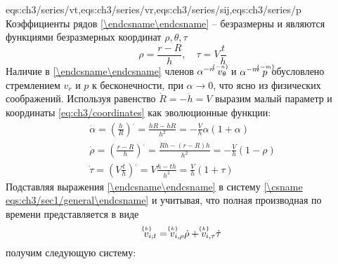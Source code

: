 \expandafter\gdef\csname eqs:ch3/series\endcsname{eqs:ch3/series/vt,eqs:ch3/series/vr,eqs:ch3/series/sij,eqs:ch3/series/p}
Коэффициенты рядов \cref{\csname eqs:ch3/series\endcsname} -- безразмерны и являются функциями безразмерных координат $\rho, \theta, \tau$
\begin{equation}
  \label{eq:ch3/coordinates}
  \rho = \frac{r-R}{h}, \quad \tau = V \frac{t}{h}
\end{equation}
Наличие в \cref{\csname eqs:ch3/series\endcsname} членов $\alpha^{-n} \; \uindex{v}{-n}_{\theta}$ и $\alpha^{-m} \; \uindex{p}{-m}$ обусловлено стремлением $v_{r}$ и $p$ к бесконечности, при $\alpha\rightarrow 0$, что ясно из физических соображений.
Используя равенство $\dot{R}=-\dot{h}= V$ выразим малый параметр и координаты \cref{eq:ch3/coordinates} как эволюционные функции:
\begin{gather}
  \dot{\alpha} = \left(\frac{h}{R}\right)^. = \frac{\dot{h}R - h\dot{R}}{h^2} = -\frac{V}{h} \alpha \left(1+\alpha\right)
  \\
  \dot{\rho} = \left(\frac{r-R}{h}\right)^. = \frac{\dot{R} h - \left(r-R\right) \dot{h}}{h^2} = -\frac{V}{h}\left(1-\rho\right)
  \\
  \dot{\tau} = \left(V \frac{t}{h}\right)^. = V \frac{h - t\dot{h}}{h^2} = \frac{V}{h} \left(1+\tau\right)
\end{gather}
Подставляя выражения \cref{\csname eqs:ch3/series\endcsname} в систему \cref{\csname eqs:ch3/sec1/general\endcsname} и учитывая, что полная производная по времени представляется в виде
\begin{equation*}
  \uindex{v}{k}_{i;t} = \uindex{v}{k}_{i,\rho} \dot{\rho} + \uindex{v}{k}_{i,\tau} \dot{\tau}
\end{equation*}
получим следующую систему:
\begingroup
\allowdisplaybreaks
